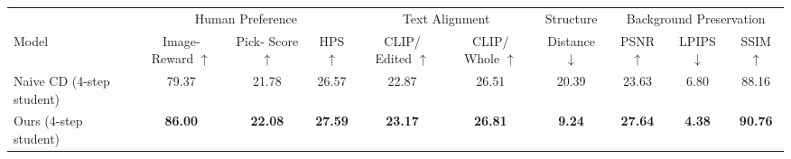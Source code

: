 \begin{tabular}{l c c c c c c c c c}
\toprule
 & \multicolumn{3}{c}{Human Preference} & \multicolumn{2}{c}{Text Alignment} & Structure & \multicolumn{3}{c}{Background Preservation} \\
\cmidrule(lr){2-4}\cmidrule(lr){5-6}\cmidrule(lr){7-7}\cmidrule(lr){8-10}
Model & \shortstack{Image-\\Reward $\uparrow$} & \shortstack{Pick-\\Score $\uparrow$} & HPS $\uparrow$ & \shortstack{CLIP/\\Edited $\uparrow$} & \shortstack{CLIP/\\Whole $\uparrow$} & Distance $\downarrow$ & PSNR $\uparrow$ & LPIPS $\downarrow$ & SSIM $\uparrow$ \\
\midrule
Naive CD (4-step student) & 79.37 & 21.78 & 26.57 & 22.87 & 26.51 & 20.39 & 23.63 & 6.80 & 88.16 \\
Ours (4-step student) & \textbf{86.00} & \textbf{22.08} & \textbf{27.59} & \textbf{23.17} & \textbf{26.81} & \textbf{9.24} & \textbf{27.64} & \textbf{4.38} & \textbf{90.76} \\
\bottomrule
\end{tabular}
